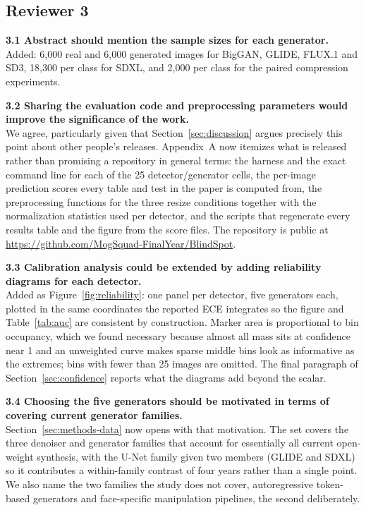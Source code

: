 \documentclass[3p,times,procedia]{elsarticle}
\begin{document}
\subsection*{Reviewer 3}

\noindent\textbf{3.1 Abstract should mention the sample sizes for each
generator.}\\[1pt]
Added: 6{,}000 real and 6{,}000 generated images for BigGAN, GLIDE, FLUX.1
and SD3, 18{,}300 per class for SDXL, and 2{,}000 per class for the paired
compression experiments.

\noindent\textbf{3.2 Sharing the evaluation code and preprocessing
parameters would improve the significance of the work.}\\[1pt]
We agree, particularly given that Section~\ref{sec:discussion} argues
precisely this point about other people's releases. Appendix~A now
itemizes what is released rather than promising a repository in general
terms: the harness and the exact command line for each of the 25
detector/generator cells, the per-image prediction scores every table and
test in the paper is computed from, the preprocessing functions for the
three resize conditions together with the normalization statistics used
per detector, and the scripts that regenerate every results table and the
figure from the score files. The repository is public at
\url{https://github.com/MogSquad-FinalYear/BlindSpot}.

\noindent\textbf{3.3 Calibration analysis could be extended by adding
reliability diagrams for each detector.}\\[1pt]
Added as Figure~\ref{fig:reliability}: one panel per detector, five
generators each, plotted in the same coordinates the reported ECE
integrates so the figure and Table~\ref{tab:auc} are consistent by
construction. Marker area is proportional to bin occupancy, which we found
necessary because almost all mass sits at confidence near 1 and an
unweighted curve makes sparse middle bins look as informative as the
extremes; bins with fewer than 25 images are omitted. The final paragraph
of Section~\ref{sec:confidence} reports what the diagrams add beyond the
scalar.

\noindent\textbf{3.4 Choosing the five generators should be motivated in
terms of covering current generator families.}\\[1pt]
Section~\ref{sec:methods-data} now opens with that motivation. The set
covers the three denoiser and generator families that account for
essentially all current open-weight synthesis, with the U-Net family given
two members (GLIDE and SDXL) so it contributes a within-family contrast of
four years rather than a single point. We also name the two families the
study does not cover, autoregressive token-based generators and
face-specific manipulation pipelines, the second deliberately.
\end{document}

